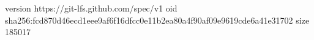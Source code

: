 version https://git-lfs.github.com/spec/v1
oid sha256:fcd870d46ecd1eee9af6f16dfcc0e11b2ea80a4f90af09e9619cde6a41e31702
size 185017
